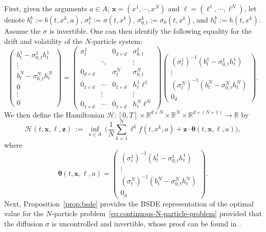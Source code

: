 \documentclass[11pt]{article}
\numberwithin{equation}{section}
\theoremstyle{plain}
\theoremstyle{definition}
\theoremstyle{remark}
\newcommand{\R}{\mathbb{R}}
\newcommand{\x}{\times}
\begin{document}
	\vspace{0.5em}
	
	First, given the arguments $a \in A$, $\mathbf{x} = (x^1, \cdots, x^N)$ and $\bm{\ell} = (\ell^1, \cdots, \ell^N)$, 
	let denote $b_t^k := b(t, x^k, a)$, $\sigma_t^k := \sigma(t, x^k)$, $\sigma_{0,t}^k := \sigma_0(t, x^k)$, and $h_t^k := h(t, x^k)$. Assume the $\sigma$ is invertible. One can then identify the following equality for the  drift and volatility of the $N$-particle system: 
	\begin{equation}
		\begin{pmatrix} b_t^1 - \sigma_{0,t}^1 h_t^1 \\ \vdots \\ b_t^N - \sigma_{0,t}^N h_t^N 
			\\ 0 \\ \vdots \\ 0 \end{pmatrix} 
		= 
		\begin{pmatrix} 
			\sigma_t^1 & & 0_{d\times d} & \sigma_{0,t}^1 \\ 
			& \ddots & & \vdots \\ 
			0_{d\times d} & & \sigma_t^N & \sigma_{0,t}^N \\ 
			0_{1\times d} & \cdots & 0_{1\times d} & h_t^1 \ell^1 \\ 
			& \vdots & & \vdots \\ 
			0_{1\times d} & \cdots & 0_{1\times d} & h_t^N \ell^N 
		\end{pmatrix} 
		\begin{pmatrix} 
			(\sigma_t^1)^{-1}(b_t^1 - \sigma_{0,t}^1 h_t^1) \\ 
			\vdots \\ 
			(\sigma_t^N)^{-1}(b_t^N - \sigma_{0,t}^N h_t^N) \\ 
			0_d 
		\end{pmatrix}.
	\end{equation}
	We then define the Hamiltonian $\mathcal{H} : [0,T] \x \R^{d \x N} \x \R^{N} \x \R^{d \x (N+1)} \longrightarrow \R$ by 
	\begin{equation*}
		\mathcal{H}(t,\mathbf{x},\bm{\ell},\mathbf{z}) 
		~:=~
		\inf_{a \in A}  ~ \bigg( \frac1N \sum_{k=1}^N \ell^k f(t, x^k, a) + \mathbf{z}\cdot \boldsymbol{\theta}(t,\mathbf{x},\bm{\ell}, a) \bigg),
	\end{equation*}
	where
	\begin{equation*}
		\boldsymbol{\theta}(t,\mathbf{x}, \bm{\ell}, a) = \begin{pmatrix} 
			(\sigma_t^1)^{-1}(b_t^1 - \sigma_{0,t}^1 h_t^1) \\ 
			\vdots \\ 
			(\sigma_t^N)^{-1}(b_t^N - \sigma_{0,t}^N h_t^N) \\ 
			0_d 
		\end{pmatrix}.
	\end{equation*}
	Next, Proposition~\ref{prop:bsde} provides the BSDE representation of the optimal value for the $N$-particle problem~\eqref{eq:continuous-N-particle-problem} provided that the diffusion $\sigma$ is uncontrolled and invertible, whose proof can be found in \cite[Theorem 4.5.3]{zhang2017backward}. 
	
\end{document}
